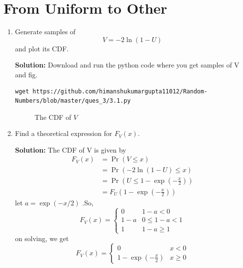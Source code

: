 \documentclass[journal,12pt,twocolumn]{IEEEtran}
\renewcommand\thesection{\arabic{section}}
\providecommand{\pr}[1]{\ensuremath{\Pr\left(#1\right)}}
\providecommand{\brak}[1]{\ensuremath{\left(#1\right)}}
\theoremstyle{remark}
\newcommand{\solution}{\noindent \textbf{Solution: }}
\numberwithin{equation}{section}
\begin{document}
\begin{enumerate}[label=\thesection.\arabic*
,ref=\thesection.\theenumi]
\end{enumerate}
\section{From Uniform to Other}
\begin{enumerate}[label=\thesection.\arabic*
,ref=\thesection.\theenumi]
%
\item
Generate samples of 
%
\begin{equation}
V = -2\ln\brak{1-U}
\end{equation}
%
and plot its CDF.  

\solution Download and run the python code where you get samples of V and fig. 
\begin{lstlisting}
wget https://github.com/himanshukumargupta11012/Random-Numbers/blob/master/ques_3/3.1.py
\end{lstlisting}
\begin{figure}
	\centering
	\caption{The CDF of $V$}
	\label{fig:ray_cdf}
\end{figure}
\item Find a theoretical expression for $F_V(x)$.

\solution The CDF of V is given by 
\begin{align}
	F_V(x)&=\pr{V\leq x}\\
	&=\pr{-2\ln\brak{1-U} \leq x}\\
	&=\pr{U\leq 1-\exp\brak{-\frac{x}{2}}}\\
	&=F_U\brak{1-\exp\brak{-\frac{x}{2}}}
\end{align}
let $a=\exp\brak{-x/2}$ .So,
\[
F_V(x)=
\begin{cases}
	0&  1-a<0\\
	1-a  &  0 \leq 1-a < 1\\
	1&  1-a\geq1	
\end{cases}
\]
on solving, we get
\[
F_V(x)=
\begin{cases}
	0&  x<0\\
	1-\exp\brak{-\frac{x}{2}}  &  x\geq0
\end{cases}
\]
\end{enumerate}
\end{document}
